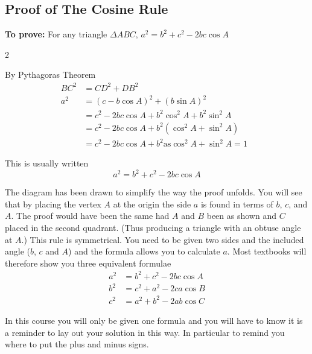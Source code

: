 \subsection{Proof of The Cosine Rule}
\textbf{To prove:} For any triangle $ \Delta A B C\text{,}$ $a^{2} =b^{2} +c^{2} -2 b c \cos  A$ \\ 
\clearpage
\columnsep =30pt
\begin {multicols}{2}

\setlength\fboxrule{0in}\setlength\fboxsep{0.2in}
By Pythagoras Theorem
\begin{align*}B C^{2} &  = C D^{2} +D B^{2} \\
a^{2} &  = \left (c -b \cos  A\right )^{2} +\left (b \sin  A\right )^{2} \\
 &  = c^{2} -2 b c \cos  A +b^{2} \cos ^{2} A +b^{2} \sin ^{2} A \\
 &  = c^{2} -2 b c \cos  A +b^{2} \left (\cos ^{2} A +\sin ^{2} A\right ) \\
 &  = c^{2} -2 b c \cos  A +b^{2}\text{as}\cos ^{2} A +\sin ^{2} A =1\text{\ }\end{align*} 
\end {multicols}
 

This is usually written
\begin{equation*}a^{2} =b^{2} +c^{2} -2 b c \cos  A
\end{equation*}

The diagram has been drawn to simplify the way the proof unfolds. You
will see that by placing the vertex $A$ at the origin the side $a$ is found in terms of $b$, $c$, and $A$. The proof would have been the same had $A$ and $B$ been as shown and $C$ placed in the second quadrant. (Thus producing a triangle with an obtuse angle at
$A$.) This rule is symmetrical. You need
to be given two sides and the included angle ($b$, $c$ and $A$) and the formula allows you to calculate $a$. Most textbooks will therefore show you three equivalent formulae
\begin{align*}a^{2} &  = b^{2} +c^{2} -2 b c \cos  A \\
b^{2} &  = c^{2} +a^{2} -2 c a \cos  B \\
c^{2} &  = a^{2} +b^{2} -2 a b \cos  C\end{align*}

In this course you will only be given one formula and you will have to know it is a reminder to
lay out your solution in this way. In particular to remind you where to put the plus and minus signs. 

